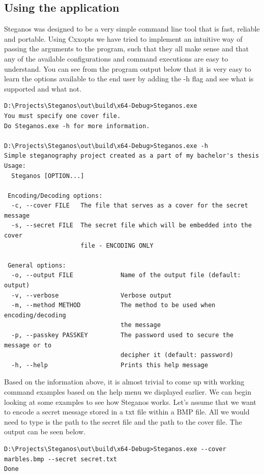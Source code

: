 \begin{multicols}{2}
\section{Using the application}
Steganos was designed to be a very simple command line tool that is fast, reliable and portable. Using Cxxopts we have tried to implement an intuitive way of passing the arguments to the program, such that they all make sense and that any of the available configurations and command executions are easy to understand. You can see from the program output below that it is very easy to learn the options available to the end user by adding the -h flag and see what is supported and what not.
\end{multicols}
\begin{verbatim}
D:\Projects\Steganos\out\build\x64-Debug>Steganos.exe
You must specify one cover file.
Do Steganos.exe -h for more information.

D:\Projects\Steganos\out\build\x64-Debug>Steganos.exe -h
Simple steganography project created as a part of my bachelor's thesis
Usage:
  Steganos [OPTION...]

 Encoding/Decoding options:
  -c, --cover FILE   The file that serves as a cover for the secret message
  -s, --secret FILE  The secret file which will be embedded into the cover
                     file - ENCODING ONLY

 General options:
  -o, --output FILE             Name of the output file (default: output)
  -v, --verbose                 Verbose output
  -m, --method METHOD           The method to be used when encoding/decoding
                                the message
  -p, --passkey PASSKEY         The password used to secure the message or to
                                decipher it (default: password)
  -h, --help                    Prints this help message
\end{verbatim}

\begin{multicols}{2}
Based on the information above, it is almost trivial to come up with working command examples based on the help menu we displayed earlier. We can begin looking at some examples to see how Steganos works. Let's assume that we want to encode a secret message stored in a txt file within a BMP file. All we would need to type is the path to the secret file and the path to the cover file. The output can be seen below.
\end{multicols}
\begin{verbatim}
D:\Projects\Steganos\out\build\x64-Debug>Steganos.exe --cover marbles.bmp --secret secret.txt
Done
\end{verbatim}

